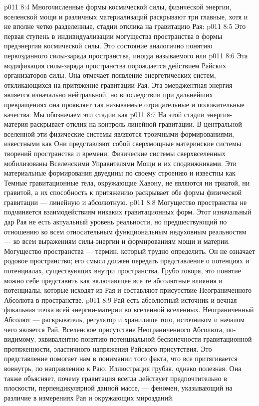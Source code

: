 \vs p011 8:4 \pc Многочисленные формы космической силы, физической энергии, вселенской мощи и различных материализаций раскрывают три главные, хотя и не вполне четко разделенные, стадии отклика на гравитацию Рая:
\vs p011 8:5 \bibnobreakspace {} Это первая ступень в индивидуализации могущества пространства в формы предэнергии космической силы. Это состояние аналогично понятию первозданного силы\hyp{}заряда пространства, иногда называемого  или 
\vs p011 8:6 \bibnobreakspace {} Эта модификация силы\hyp{}заряда пространства порождается действием Райских организаторов силы. Она отмечает появление энергетических систем, откликающихся на притяжение гравитации Рая. Эта эмерджентная энергия является изначально нейтральной, но впоследствии при дальнейших превращениях она проявляет так называемые отрицательные и положительные качества. Мы обозначаем эти стадии как 
\vs p011 8:7 \bibnobreakspace {} На этой стадии энергия\hyp{}материя раскрывает отклик на контроль линейной гравитации. В центральной вселенной эти физические системы являются троичными формированиями, известными как  Они представляют собой сверхмощные материнские системы творений пространства и времени. Физические системы сверхвселенных мобилизованы Вселенскими Управителями Мощи и их сподвижниками. Эти материальные формирования двуедины по своему строению и известны как  Темные гравитационные тела, окружающие Хавону, не являются ни триатой, ни гравитой, а их способность к притяжению раскрывает обе формы физической гравитации --- линейную и абсолютную.
\vs p011 8:8 \pc Могущество пространства не подчиняется взаимодействиям никаких гравитационных форм. Этот изначальный дар Рая не есть актуальный уровень реальности, но предшествующий по отношению ко всем относительным функциональным недуховным реальностям --- ко всем выражениям силы\hyp{}энергии и формированиям мощи и материи. Могущество пространства --- термин, который трудно определить. Он не означает родовое пространство; его смысл должен передать представление о потенциях и потенциалах, существующих внутри пространства. Грубо говоря, это понятие можно себе представить как включающее все те абсолютные влияния и потенциалы, которые исходят из Рая и составляют присутствие Неограниченного Абсолюта в пространстве.
\vs p011 8:9 Рай есть абсолютный источник и вечная фокальная точка всей энергии\hyp{}материи во вселенной вселенных. Неограниченный Абсолют --- раскрыватель, регулятор и хранилище того, источником и началом чего является Рай. Вселенское присутствие Неограниченного Абсолюта, по\hyp{}видимому, эквивалентно понятию потенциальной бесконечности гравитационной протяженности, эластичного напряжения Райского присутствия. Это представление помогает нам в понимании того факта, что все притягивается вовнутрь, по направлению к Раю. Иллюстрация грубая, однако полезная. Она также объясняет, почему гравитация всегда действует предпочтительно в плоскости, перпендикулярной данной массе, --- феномен, указывающий на различие в измерениях Рая и окружающих мирозданий.
